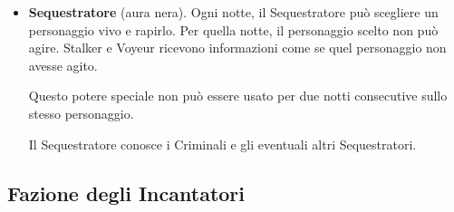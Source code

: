 \documentclass[a4paper,10pt]{article}
\begin{document}
\begin{itemize}
 \item {\bf Sequestratore} (aura nera). Ogni notte, il Sequestratore può scegliere un personaggio vivo e rapirlo. Per quella notte, il personaggio scelto non può agire.
 Stalker e Voyeur ricevono informazioni come se quel personaggio non avesse agito.
 
 Questo potere speciale non può essere usato per due notti consecutive sullo stesso personaggio.
 
 Il Sequestratore conosce i Criminali e gli eventuali altri Sequestratori.


\end{itemize}

\subsection*{Fazione degli Incantatori}
\end{document}
